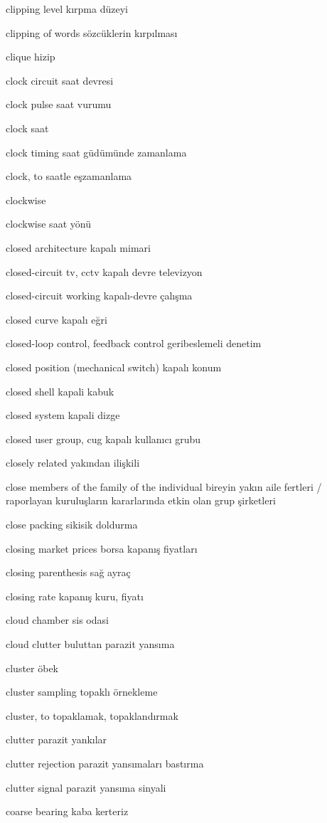 \documentclass[12pt,fleqn]{article}\usepackage{../../common}
\begin{document}
clipping level kırpma düzeyi

clipping of words sözcüklerin kırpılması

clique hizip

clock circuit saat devresi

clock pulse saat vurumu

clock saat

clock timing saat güdümünde zamanlama

clock, to saatle eşzamanlama

clockwise

clockwise saat yönü

closed architecture kapalı mimari

closed-circuit tv, cctv kapalı devre televizyon

closed-circuit working kapalı-devre çalışma

closed curve kapalı eğri

closed-loop control, feedback control geribeslemeli denetim

closed position (mechanical switch) kapalı konum

closed shell kapali kabuk

closed system kapali dizge

closed user group, cug kapalı kullanıcı grubu

closely related yakından ilişkili

close members of the family of the individual bireyin yakın aile fertleri / raporlayan kuruluşların kararlarında etkin olan grup şirketleri

close packing sikisik doldurma

closing market prices borsa kapanış fiyatları

closing parenthesis sağ ayraç

closing rate kapanış kuru, fiyatı

cloud chamber sis odasi

cloud clutter buluttan parazit yansıma

cluster öbek

cluster sampling topaklı örnekleme

cluster, to topaklamak, topaklandırmak

clutter parazit yankılar

clutter rejection parazit yansımaları bastırma

clutter signal parazit yansıma sinyali

coarse bearing kaba kerteriz
\end{document}

